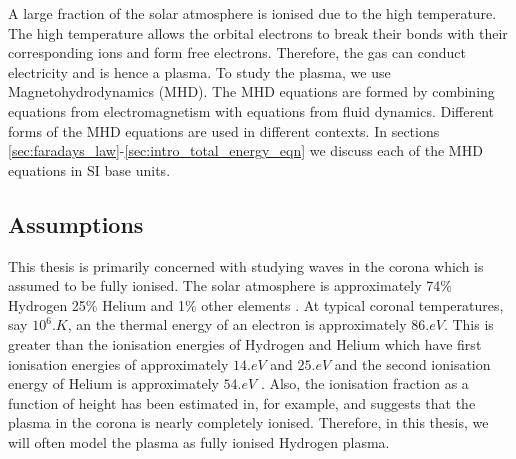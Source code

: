 A large fraction of the solar atmosphere is ionised \citep{Shimizu2018} due to the high temperature. The high temperature allows the orbital electrons to break their bonds with their corresponding ions and form free electrons. Therefore, the gas can conduct electricity and is hence a plasma. To study the plasma, we use Magnetohydrodynamics (MHD). The MHD equations are formed by combining equations from electromagnetism with equations from fluid dynamics. Different forms of the MHD equations are used in different contexts. In sections \ref{sec:faradays_law}-\ref{sec:intro_total_energy_eqn} we discuss each of the MHD equations in SI base units.


\subsection{Assumptions}
\label{sec:intro_assumptions}

This thesis is primarily concerned with studying waves in the corona which is assumed to be fully ionised. The solar atmosphere is approximately 74\% Hydrogen 25\% Helium and 1\% other elements \citep{sun_vital_statistics}. At typical coronal temperatures, say $10^6\si{.K}$, an the thermal energy of an electron is approximately $86\si{.eV}$. This is greater than the ionisation energies of Hydrogen and Helium which have first ionisation energies of approximately $14\si{.eV}$ and $25\si{.eV}$ and the second ionisation energy of Helium is approximately $54\si{.eV}$ \citep{Lide2003}. Also, the ionisation fraction as a function of height has been estimated in, for example, \citet{Shimizu2018} and suggests that the plasma in the corona is nearly completely ionised. Therefore, in this thesis, we will often model the plasma as fully ionised Hydrogen plasma.

